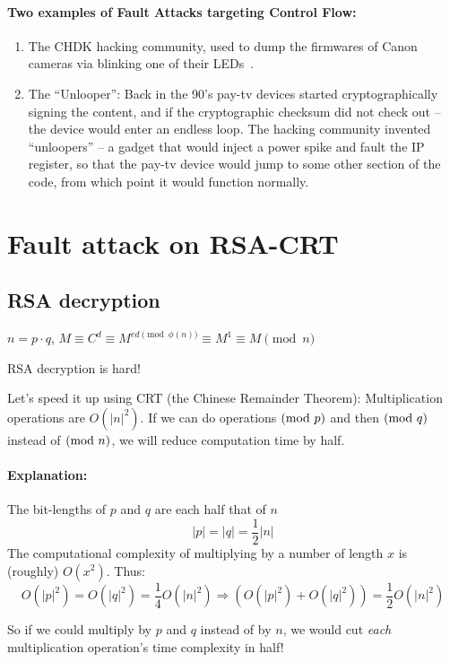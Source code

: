\paragraph{Two examples of Fault Attacks targeting Control Flow:}
\begin{enumerate}
	\item The CHDK hacking community, used to dump the firmwares of Canon
	cameras via blinking one of their LEDs~\cite{chdk, canon}.

	\item The ``Unlooper'': Back in the 90's pay-tv devices started
	cryptographically signing the content, and if the cryptographic checksum did
	not check out -- the device would enter an endless loop. The hacking
	community invented ``unloopers'' -- a gadget that would inject a power spike
	and fault the IP register, so that the pay-tv device would jump to some
	other section of the code, from which point it would function normally.
\end{enumerate}

\section{Fault attack on RSA-CRT}\label{sec:fault_attack_on_rsa_crt}

\subsection{RSA decryption}\label{subsec:rsa_decryption}
\(n = p\cdot q\), \(M \equiv C^d  \equiv M^{ed \pmod{\phi(n)}} \equiv M^1 \equiv M \pmod{n}\)

RSA decryption is hard!

Let's speed it up using CRT (the Chinese Remainder Theorem): Multiplication
operations are \(O(|n|^2)\). If we can do operations$\ (\mathrm{mod}\ p)$ and then$\ (\mathrm{mod}\ q)$ instead of$\ (\mathrm{mod}\ n)$, we will reduce computation time by half.

\paragraph{Explanation:}

The bit-lengths of \(p\) and \(q\) are each half that of \(n\)
\[|p|=|q|=\frac{1}{2}|n|\] The computational complexity of multiplying by a
number of length \(x\) is (roughly) \(O(x^2)\). Thus:
\[
O(|p|^2) = O(|q|^2) = \frac{1}{4}O(|n|^2) \Rightarrow (O(|p|^2) + O(|q|^2)) = \frac{1}{2}O(|n|^2)
\]

So if we could multiply by \(p\) and \(q\) instead of by \(n\), we would cut
\emph{each} multiplication operation's time complexity in half!

